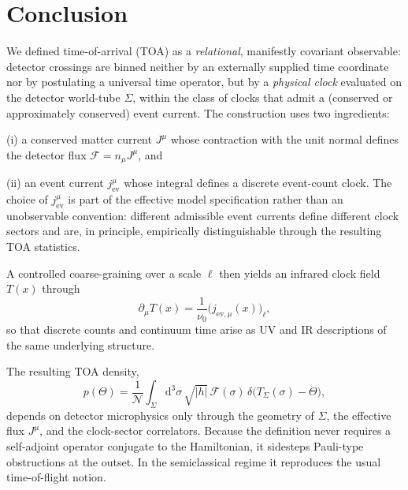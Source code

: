 \documentclass[pdflatex,sn-mathphys-num]{sn-jnl}
\theoremstyle{thmstylethree}
\theoremstyle{thmstyleone}
\theoremstyle{thmstyletwo}
\numberwithin{equation}{section}
\newcommand{\dd}{\mathrm{d}}
\begin{document}
    \section{Conclusion}
    
    We defined time-of-arrival (TOA) as a \emph{relational}, manifestly covariant observable: detector crossings are binned neither by an externally supplied time coordinate nor by postulating a universal time operator, but by a \emph{physical clock} evaluated on the detector world-tube $\Sigma$, within the class of clocks that admit a (conserved or approximately conserved) event current. The construction uses two ingredients:
    
    \smallskip
    \noindent
    (i) a conserved matter current $J^\mu$ whose contraction with the unit normal defines the detector flux $\mathcal{F}=n_\mu J^\mu$, and
    
    \noindent
    (ii) an event current $j^\mu_{\mathrm{ev}}$ whose integral defines a discrete event-count clock. The choice of $j^\mu_{\mathrm{ev}}$ is part of the effective model specification rather than an unobservable convention: different admissible event currents define different clock sectors and are, in principle, empirically distinguishable through the resulting TOA statistics.
    
    \smallskip
    A controlled coarse-graining over a scale $\ell$ then yields an infrared clock field $T(x)$ through
    \begin{equation}
        \partial_\mu T(x)=\frac{1}{\nu_0}\big(j_{\mathrm{ev},\mu}(x)\big)_\ell,
    \end{equation}
    so that discrete counts and continuum time arise as UV and IR descriptions of the same underlying structure.
    
    The resulting TOA density,
    \begin{equation}
        p(\Theta)=
        \frac{1}{\mathcal{N}}
        \int_{\Sigma}\dd^3\sigma\,\sqrt{|h|}\,
        \mathcal{F}(\sigma)\,
        \delta\!\big(T_\Sigma(\sigma)-\Theta\big),
    \end{equation}
    depends on detector microphysics only through the geometry of $\Sigma$, the effective flux $J^\mu$, and the clock-sector correlators. Because the definition never requires a self-adjoint operator conjugate to the Hamiltonian, it sidesteps Pauli-type obstructions at the outset. In the semiclassical regime it reproduces the usual time-of-flight notion.
    
\end{document}
